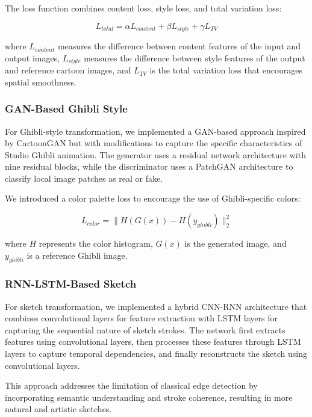 \documentclass[conference]{IEEEtran}
\begin{document}
The loss function combines content loss, style loss, and total variation loss:

\begin{equation}
L_{total} = \alpha L_{content} + \beta L_{style} + \gamma L_{TV}
\end{equation}

where $L_{content}$ measures the difference between content features of the input and output images, $L_{style}$ measures the difference between style features of the output and reference cartoon images, and $L_{TV}$ is the total variation loss that encourages spatial smoothness.

\subsubsection{GAN-Based Ghibli Style}
For Ghibli-style transformation, we implemented a GAN-based approach inspired by CartoonGAN \cite{chen2018cartoongan} but with modifications to capture the specific characteristics of Studio Ghibli animation. The generator uses a residual network architecture with nine residual blocks, while the discriminator uses a PatchGAN architecture to classify local image patches as real or fake.

We introduced a color palette loss to encourage the use of Ghibli-specific colors:

\begin{equation}
L_{color} = \|H(G(x)) - H(y_{ghibli})\|_2^2
\end{equation}

where $H$ represents the color histogram, $G(x)$ is the generated image, and $y_{ghibli}$ is a reference Ghibli image.

\subsubsection{RNN-LSTM-Based Sketch}
For sketch transformation, we implemented a hybrid CNN-RNN architecture that combines convolutional layers for feature extraction with LSTM layers for capturing the sequential nature of sketch strokes. The network first extracts features using convolutional layers, then processes these features through LSTM layers to capture temporal dependencies, and finally reconstructs the sketch using convolutional layers.

This approach addresses the limitation of classical edge detection by incorporating semantic understanding and stroke coherence, resulting in more natural and artistic sketches.
\end{document}
